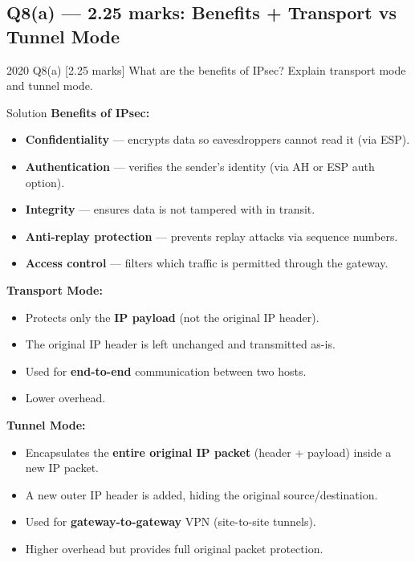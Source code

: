 \documentclass[12pt,a4paper]{article}
\begin{document}
\subsection{Q8(a) --- 2.25 marks: Benefits + Transport vs Tunnel Mode}

\begin{qbox}{2020 Q8(a) [2.25 marks]}
  What are the benefits of IPsec? Explain transport mode and tunnel mode.
\end{qbox}

\begin{solbox}{Solution}
\textbf{Benefits of IPsec:}
\begin{itemize}[nosep]
  \item \textbf{Confidentiality} --- encrypts data so eavesdroppers cannot read it (via ESP).
  \item \textbf{Authentication} --- verifies the sender's identity (via AH or ESP auth option).
  \item \textbf{Integrity} --- ensures data is not tampered with in transit.
  \item \textbf{Anti-replay protection} --- prevents replay attacks via sequence numbers.
  \item \textbf{Access control} --- filters which traffic is permitted through the gateway.
\end{itemize}

\bigskip
\textbf{Transport Mode:}
\begin{itemize}[nosep]
  \item Protects only the \textbf{IP payload} (not the original IP header).
  \item The original IP header is left unchanged and transmitted as-is.
  \item Used for \textbf{end-to-end} communication between two hosts.
  \item Lower overhead.
\end{itemize}

\textbf{Tunnel Mode:}
\begin{itemize}[nosep]
  \item Encapsulates the \textbf{entire original IP packet} (header + payload) inside a new IP packet.
  \item A new outer IP header is added, hiding the original source/destination.
  \item Used for \textbf{gateway-to-gateway} VPN (site-to-site tunnels).
  \item Higher overhead but provides full original packet protection.
\end{itemize}
\end{solbox}
\end{document}
